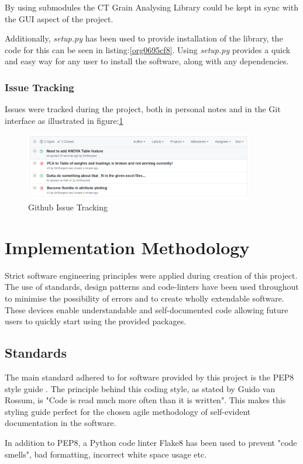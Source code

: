 \documentclass[11pt]{report}
\begin{document}
By using submodules the CT Grain Analysing Library could be kept in sync with the GUI aspect of the project.

Additionally, \emph{setup.py} has been used to provide installation of the library, the code for this can be seen in listing:\ref{org0695cf8}. Using \emph{setup.py} provides a quick and easy way for any user to install the software, along with any dependencies.

\subsubsection{Issue Tracking}
\label{sec:org3b569ec}
Issues were tracked during the project, both in personal notes and in the Git interface as illustrated in figure:\ref{fig:orgff7ba60}
\begin{figure}[htbp]
\centering
\includegraphics[width=10cm]{./images/github.png}
\caption{\label{fig:orgff7ba60}
Github Issue Tracking}
\end{figure}

\section{Implementation Methodology}
\label{sec:org0eba81c}
Strict software engineering principles were applied during creation of this project. The use of standards, design patterns and code-linters have been used throughout to minimise the possibility of errors and to create wholly extendable software. These devices enable understandable and self-documented code allowing future users to quickly start using the provided packages.
\subsection{Standards}
\label{sec:orgacde0ad}
The main standard adhered to for software provided by this project is the PEP8 style guide \cite{VanRossum}. The principle behind this coding style, as stated by Guido van Rossum, is "Code is read much more often than it is written". This makes this styling guide perfect for the chosen agile methodology of self-evident documentation in the software.

In addition to PEP8, a Python code linter Flake8 has been used to prevent "code smells", bad formatting, incorrect white space usage etc.
\end{document}
